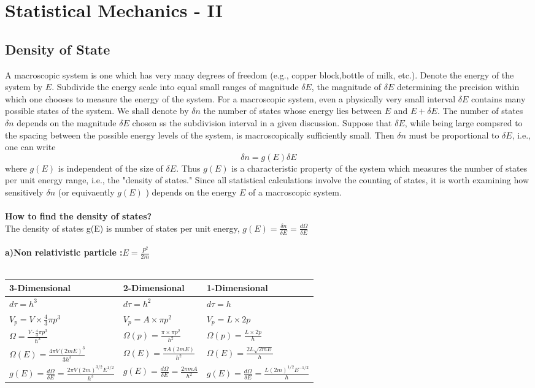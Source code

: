 \chapter{Statistical Mechanics - II}
\section{Density of State  }
A macroscopic system is one which has very many degrees of freedom (e.g., copper block,bottle of milk, etc.). Denote the energy of the system by $E$. Subdivide the energy scale into equal small ranges of magnitude $\delta E$, the magnitude of $\delta E$ determining the precision within which one chooses to measure the energy of the system. For a macroscopic system, even a physically very small interval $\delta E$ contains many possible states of the system. We shall denote by $\delta n$ the number of states whose energy lies between $E$ and $E+\delta E$.
The number of states $\delta n$ depends on the magnitude $\delta E$ chosen ss the subdivision interval in a given discussion. Suppose that $\delta E$, while being large compsred to the spacing between the possible energy levels of the system, is macroscopically sufficiently small. Then $\delta n$ must be proportional to $\delta E$, i.e., one can write
$$
\delta n=g(E) \delta E
$$
where $g(E)$ is independent of the size of $\delta E$. Thus $g(E)$ is a characteristic property of the system which measures the number of states per unit energy range, i.e., the "density of states." Since all statistical calculations involve the counting of states, it is worth examining how sensitively $\delta n$ (or equivaently $g(E)$ ) depends on the energy $E$ of a macroscopic system.\\\\
\textbf{How to find the density of states? }\\
The density of states g(E) is number of states per unit energy, $g(E) =\frac{\delta n}{\delta E}=\frac{d\Omega}{\delta E}$ \\\\
\textbf{a)\quad Non relativistic particle :$E=\frac{P^2}{2m}$}\\\\
\renewcommand*{\arraystretch}{1.8}
\begin{tabular}{|p{5cm}|p{5cm}|p{5cm}|}
	\hline
	3-Dimensional&2-Dimensional&1-Dimensional\\\hline
	$d \tau=h^{3}$&$d \tau=h^{2}$&$d \tau=h$\\\hline
	$V_{p}=V \times \frac{4}{3} \pi p^{3}$&$V_{p}=A \times \pi p^{2}$&$V_p=L\times2p$\\\hline
	$\Omega=\frac{V \cdot \frac{4}{3} \pi p^{3}}{\hbar^{3}}$&$\Omega(p)=\frac{\pi \times \pi p^{2}}{h^{2}}$&$\Omega(p)=\frac{L \times 2 p}{h}$\\\hline
	$\Omega(E)=\frac{4\pi V(2mE)^3}{3h^3}$&$\Omega(E)=\frac{\pi A(2mE)}{h^2}$&$\Omega(E)=\frac{2L\sqrt{2mE}}{h}$\\\hline
	$g(E)=\frac{d\Omega}{\delta E}=\frac{2 \pi V(2 m)^{3 / 2} E^{1 / 2}}{h^3}$&$g(E)=\frac{d\Omega}{\delta E}=\frac{2 \pi mA}{h^2}$&$g(E)=\frac{d\Omega}{\delta E}=\frac{L(2m)^{1/2}E^{-1/2}}{h}$\\\hline
\end{tabular}
